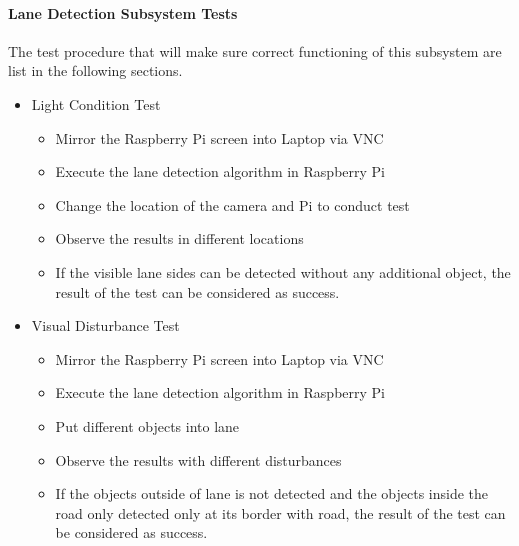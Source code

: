 \documentclass[a4paper,12pt]{article}
\begin{document}
	\paragraph{Lane Detection Subsystem Tests}	
	The test procedure that will make sure correct functioning of this subsystem are list in the following sections.
	\begin{itemize}
		\item{Light Condition Test}
				\begin{itemize}
				\item Mirror the Raspberry Pi screen into Laptop via VNC 
				\item Execute the lane detection algorithm in Raspberry Pi
				\item Change the location of the camera and Pi to conduct test
				\item Observe the results in different locations  
				\item If the visible lane sides can be detected without any additional object, the result of the test can be considered as success.
			\end{itemize}
		\item{Visual Disturbance Test}
			\begin{itemize}
			\item Mirror the Raspberry Pi screen into Laptop via VNC 
			\item Execute the lane detection algorithm in Raspberry Pi
			\item Put different objects into lane
			\item Observe the results with different disturbances
			\item If the objects outside of lane is not detected and the objects inside the road only detected only at its border with road, the result of the test can be considered as success.
		\end{itemize}
	\end{itemize}
	
\end{document}
